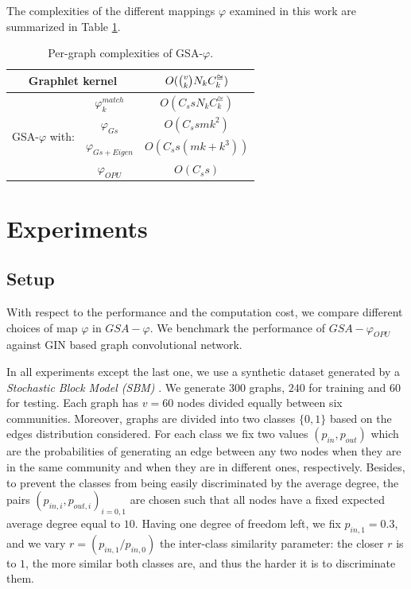 \documentclass{article}
\begin{document}
The complexities of the different mappings $\varphi$ examined in this work are summarized in Table \ref{tab:cost}.



\begin{table}
\centering
\begin{tabular}{|c|c|c|}
\hline
\multicolumn{2}{|c|}{Graphlet kernel} & $O(\tbinom{v}{k} N_k C^{\cong}_k)$\\ \hline \hline
%
\multirow{4}{*}{GSA-$\varphi$ with:} & $\varphi^{match}_k$ & $O(C_s s N_k C^{\cong}_k)$ \\
& $\varphi_{Gs}$ & $O(C_s s m k^2)$ \\ 
& $\varphi_{Gs+Eigen}$  & $O(C_s s (m k + k^3))$ \\ 
& $\varphi_{OPU}$  & $O(C_s s)$ \\ \hline
\end{tabular}
\caption{Per-graph complexities of GSA-$\varphi$.}
\label{tab:cost}
\end{table}


\section{Experiments}\label{sec:experiments}
\subsection{Setup}\label{sec:setup}
With respect to the performance and  the computation cost, we compare different choices of  map $\varphi$ in $GSA-\varphi$. We benchmark the performance of $GSA-\varphi_{OPU}$ against GIN based graph convolutional network.

In all experiments except the last one, we use a synthetic dataset generated by a \emph{Stochastic Block Model (SBM)} \cite{SBM}. We generate $300$ graphs, $240$ for training  and $60$ for testing. Each graph has $v=60$ nodes divided equally between six communities. Moreover, graphs are divided into two classes $\{0 , 1\}$ based on the edges distribution considered. For each class we fix two values $(p_{in} , p_{out})$ which are  the probabilities of generating an edge between any two nodes when they are in the same community and when they are in different ones, respectively. Besides, to prevent the classes from being easily discriminated by the average degree, the pairs $(p_{in,i} , p_{out,i})_{i=0,1}$ are chosen such that all nodes have a fixed expected average degree equal to $10$. Having one degree of freedom left, we fix $p_{in,1}=0.3$, and we vary $r=(p_{in,1}/p_{in,0})$ the inter-class similarity parameter: the closer $r$ is to $1$, the more similar both classes are, and thus the harder it is to discriminate them.
\end{document}
